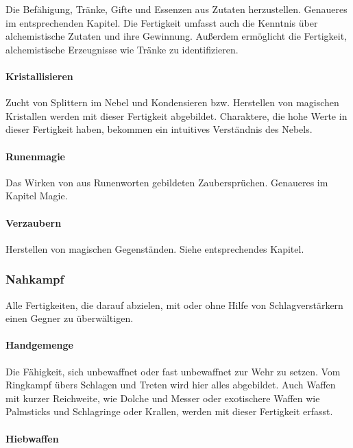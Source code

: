 \documentclass{article}
\begin{document}
Die Befähigung, Tränke, Gifte und Essenzen aus Zutaten herzustellen. Genaueres im entsprechenden Kapitel. Die Fertigkeit
umfasst auch die Kenntnis über alchemistische Zutaten und ihre Gewinnung. Außerdem ermöglicht die Fertigkeit,
alchemistische Erzeugnisse wie Tränke zu identifizieren.

\paragraph{Kristallisieren}

Zucht von Splittern im Nebel und Kondensieren bzw. Herstellen von magischen Kristallen werden mit dieser Fertigkeit
abgebildet. Charaktere, die hohe Werte in dieser Fertigkeit haben, bekommen ein intuitives Verständnis des Nebels.

\paragraph{Runenmagie}

Das Wirken von aus Runenworten gebildeten Zaubersprüchen. Genaueres im Kapitel Magie.

\paragraph{Verzaubern}

Herstellen von magischen Gegenständen. Siehe entsprechendes Kapitel.

\subsubsection{Nahkampf}

Alle Fertigkeiten, die darauf abzielen, mit oder ohne Hilfe von Schlagverstärkern einen Gegner zu überwältigen.

\paragraph{Handgemenge}

Die Fähigkeit, sich unbewaffnet oder fast unbewaffnet zur Wehr zu setzen. Vom Ringkampf übers Schlagen und Treten
wird hier alles abgebildet. Auch Waffen mit kurzer Reichweite, wie Dolche und Messer oder exotischere Waffen wie
Palmsticks und Schlagringe oder Krallen, werden mit dieser Fertigkeit erfasst.

\paragraph{Hiebwaffen}
\end{document}
